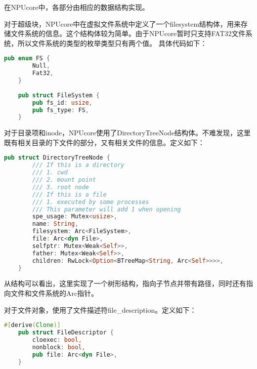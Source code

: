 在NPUcore中，各部分由相应的数据结构实现。

对于超级块，NPUcore中在虚拟文件系统中定义了一个filesystem结构体，用来存储文件系统的信息。这个结构体较为简单。由于NPUcore暂时只支持FAT32文件系统，所以文件系统的类型的枚举类型只有两个值。
具体代码如下：

\begin{lstlisting}[language={Rust}, label={filesystem},
	caption={filesystem}]
	pub enum FS {
		Null,
		Fat32,
	}
	
	pub struct FileSystem {
		pub fs_id: usize,
		pub fs_type: FS,
	}
\end{lstlisting}

对于目录项和inode，NPUcore使用了DirectoryTreeNode结构体。不难发现，这里既有相关目录的下文件的部分，又有相关文件的信息。定义如下：

\begin{lstlisting}[language={Rust}, label={DirectoryTreeNode},
	caption={DirectoryTreeNode}]
	pub struct DirectoryTreeNode {
		/// If this is a directory
		/// 1. cwd
		/// 2. mount point
		/// 3. root node
		/// If this is a file
		/// 1. executed by some processes
		/// This parameter will add 1 when opening
		spe_usage: Mutex<usize>,
		name: String,
		filesystem: Arc<FileSystem>,
		file: Arc<dyn File>,
		selfptr: Mutex<Weak<Self>>,
		father: Mutex<Weak<Self>>,
		children: RwLock<Option<BTreeMap<String, Arc<Self>>>>,
	}
\end{lstlisting}

从结构可以看出，这里实现了一个树形结构，指向子节点并带有路径，同时还有指向文件和文件系统的Arc指针。

对于文件对象，使用了文件描述符file\_description。定义如下：

\begin{lstlisting}[language={Rust}, label={DirectoryTreeNode},
	caption={DirectoryTreeNode}]
	#[derive(Clone)]
	pub struct FileDescriptor {
		cloexec: bool,
		nonblock: bool,
		pub file: Arc<dyn File>,
	}
\end{lstlisting}

